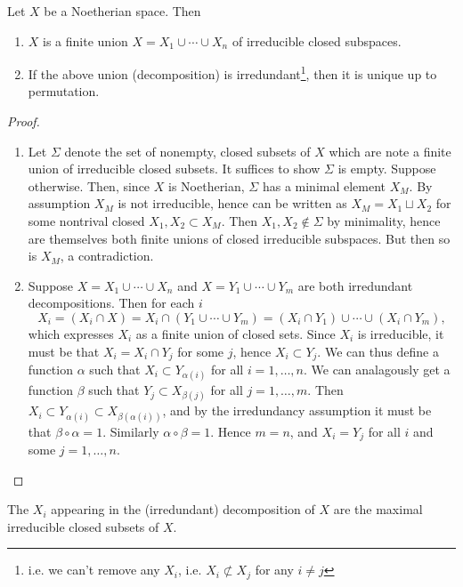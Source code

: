 \documentclass[12pt]{article}
\begin{document}
\begin{proposition}
	Let $X$ be a Noetherian space. Then 
	\begin{enumerate}
		\item $X$ is a finite union $X=X_1\cup\cdots\cup X_n$ of irreducible closed subspaces.
		\item If the above union (decomposition) is irredundant\footnote{i.e. we can't remove any $X_i$, i.e. $X_i\not\subset X_j$ for any $i\neq j$}, then it is unique up to permutation.
	\end{enumerate}
\end{proposition}
\begin{proof}
	\hfill 
	\begin{enumerate}
		\item Let $\Sigma$ denote the set of nonempty, closed subsets of $X$ which are note a finite union of irreducible closed subsets. It suffices to show $\Sigma$ is empty. Suppose otherwise. Then, since $X$ is Noetherian, $\Sigma$ has a minimal element $X_M$. By assumption $X_M$ is not irreducible, hence can be written as $X_M=X_1\sqcup X_2$ for some nontrival closed $X_1,X_2\subset X_M$. Then $X_1,X_2\not\in\Sigma$ by minimality, hence are themselves both finite unions of closed irreducible subspaces. But then so is $X_M$, a contradiction.
		\item Suppose $X=X_1\cup\cdots\cup X_n$ and $X=Y_1\cup\cdots\cup Y_m$ are both irredundant decompositions. Then for each $i$ 
			\begin{equation*}
				X_i = (X_i \cap X) = X_i \cap (Y_1\cup\cdots\cup Y_m) = (X_i\cap Y_1) \cup \cdots \cup (X_i\cap Y_m),
			\end{equation*}
			which expresses $X_i$ as a finite union of closed sets. Since $X_i$ is irreducible, it must be that $X_i=X_i\cap Y_j$ for some $j$, hence $X_i\subset Y_j$. We can thus define a function $\alpha$ such that $X_i\subset Y_{\alpha(i)}$ for all $i=1,\dots,n$. We can analagously get a function $\beta$ such that $Y_j\subset X_{\beta(j)}$ for all $j=1,\dots,m$. Then $X_i\subset Y_{\alpha(i)}\subset X_{\beta(\alpha(i))}$, and by the irredundancy assumption it must be that $\beta\circ\alpha=1$. Similarly $\alpha\circ\beta=1$. Hence $m=n$, and $X_i=Y_j$ for all $i$ and some $j=1,\dots,n$.
	\end{enumerate}
\end{proof}

\begin{corollary}
	The $X_i$ appearing in the (irredundant) decomposition of $X$ are the maximal irreducible closed subsets of $X$.
\end{corollary}
\end{document}
